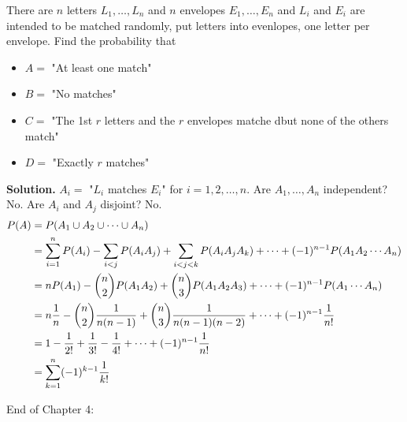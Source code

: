 \documentclass[english, 11pt]{article}
\begin{document}
  \begin{exmp}
    There are $n$ letters $L_1, \ldots, L_n$ and $n$ envelopes $E_1, \ldots, E_n$ and $L_i$ and $E_i$ are intended to be matched randomly, put letters into evenlopes, one letter per envelope. Find the probability that
    \begin{itemize}
      \item $A = $ "At least one match"
      \item $B = $ "No matches"
      \item $C = $ "The 1st $r$ letters and the $r$ envelopes matche dbut none of the others match"
      \item $D = $ "Exactly $r$ matches"
    \end{itemize}

    \textbf{Solution.} $A_i = $ "$L_i$ matches $E_i$" for $i = 1,2,\ldots, n$. Are $A_1, \ldots, A_n$ independent? No. Are $A_i$ and $A_j$ disjoint? No.
    \begin{align*}
      P(A) & = P(A_1 \cup A_2 \cup \cdots \cup A_n) \\
      & = \sum_{i = 1}^n P(A_i) - \sum_{i < j} P(A_iA_j) + \sum_{i < j < k} P(A_iA_jA_k) + \cdots + (-1)^{n-1} P(A_1A_2\cdots A_n) \\
      & = nP(A_1) - {n \choose 2}P(A_1A_2) + {n \choose 3}P(A_1A_2A_3) + \cdots + (-1)^{n-1}P(A_1\cdots A_n) \\
      & = n\frac{1}{n} - {n \choose 2}\frac{1}{n(n-1)} + {n \choose 3}\frac{1}{n(n-1)(n-2)} + \cdots + (-1)^{n-1}\frac{1}{n!} \\
      & = 1 - \frac{1}{2!} + \frac{1}{3!} - \frac{1}{4!} + \cdots + (-1)^{n-1}\frac{1}{n!} \\
      & = \sum_{k=1}^n (-1)^{k-1} \frac{1}{k!}
    \end{align*}
  \end{exmp}


  End of Chapter 4:
\end{document}
